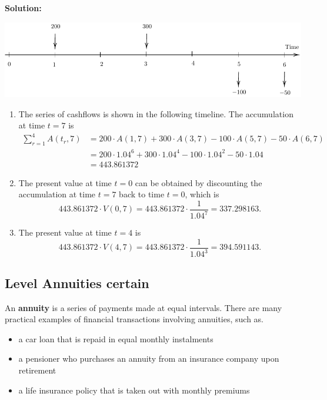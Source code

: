 \documentclass[
]{book}
\theoremstyle{definition}
\theoremstyle{definition}
\theoremstyle{definition}
\theoremstyle{definition}
\theoremstyle{remark}
\begin{document}
\textbf{Solution:}

\begin{center}\includegraphics{SCMA266Bookdownproj_files/figure-latex/tikz-ex8-1} \end{center}

\begin{enumerate}
\def\labelenumi{\arabic{enumi}.}
\item
  The series of cashflows is shown in the following timeline. The
  accumulation at time \(t = 7\) is \[\begin{aligned}
      \sum_{r=1}^4 A(t_r,7) &= 200 \cdot A(1,7) +  300 \cdot A(3,7) -  100 \cdot A(5,7) -  50 \cdot A(6,7) \\
      &= 200 \cdot 1.04^6 + 300 \cdot 1.04^4 - 100 \cdot 1.04^2 - 50 \cdot 1.04 \\
      & = 443.861372\end{aligned}\]
\item
  The present value at time \(t = 0\) can be obtained by discounting the
  accumulation at time \(t = 7\) back to time \(t = 0\), which is
  \[443.861372  \cdot V(0,7) = 443.861372  \cdot \frac{1}{1.04^7} = 337.298163.\]
\item
  The present value at time \(t = 4\) is
  \[443.861372  \cdot V(4,7) = 443.861372  \cdot \frac{1}{1.04^3} = 394.591143.\]
\end{enumerate}

\subsection{Level Annuities certain}\label{level-annuities-certain}

An \textbf{annuity} is a series of payments made at equal intervals. There are many practical examples of financial transactions involving annuities, such as.

\begin{itemize}
\item
  a car loan that is repaid in equal monthly instalments
\item
  a pensioner who purchases an annuity from an insurance company upon retirement
\item
  a life insurance policy that is taken out with monthly premiums
\end{itemize}
\end{document}
